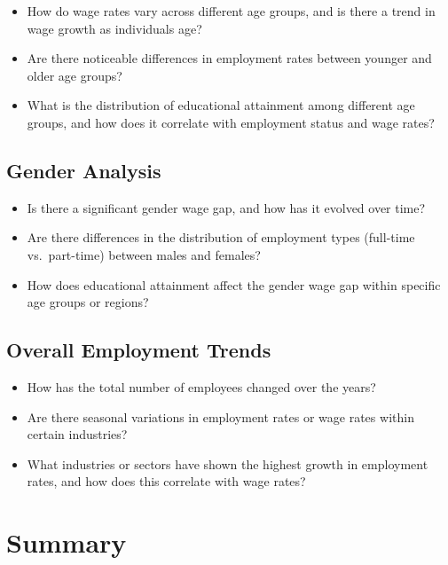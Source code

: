 \documentclass[
]{article}
\providecommand{\tightlist}{%
  \setlength{\itemsep}{0pt}\setlength{\parskip}{0pt}}
\begin{document}
\begin{itemize}
\tightlist
\item
  How do wage rates vary across different age groups, and is there a
  trend in wage growth as individuals age?
\item
  Are there noticeable differences in employment rates between younger
  and older age groups?
\item
  What is the distribution of educational attainment among different age
  groups, and how does it correlate with employment status and wage
  rates?
\end{itemize}

\subsection{Gender Analysis}\label{gender-analysis}

\begin{itemize}
\tightlist
\item
  Is there a significant gender wage gap, and how has it evolved over
  time?
\item
  Are there differences in the distribution of employment types
  (full-time vs.~part-time) between males and females?
\item
  How does educational attainment affect the gender wage gap within
  specific age groups or regions?
\end{itemize}

\subsection{Overall Employment Trends}\label{overall-employment-trends}

\begin{itemize}
\tightlist
\item
  How has the total number of employees changed over the years?
\item
  Are there seasonal variations in employment rates or wage rates within
  certain industries?
\item
  What industries or sectors have shown the highest growth in employment
  rates, and how does this correlate with wage rates?
\end{itemize}

\section{Summary}\label{summary}
\end{document}

